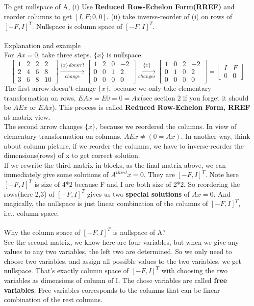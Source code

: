 \documentclass{article}
\begin{document}
\begin{spacing}{1.5}
\section{}
To get nullspace of A, (i) Use {\bfseries Reduced Row-Echelon Form(RREF)} and reorder columns to get $[I, F; 0, 0]$. (ii) take inverse-reorder of (i) on rows of $[-F, I]^T$. Nullspace is column space of  $[-F, I]^T$. \\
\\Explanation and example \\
For $Ax=0$, take three steps. $\{x\}$ is nullspace.
$$
\begin{bmatrix}
1 & 2 & 2 & 2 \\
2 & 4 & 6 & 8 \\ 
3 & 6 & 8 & 10 
\end{bmatrix}
\xrightarrow[change]{\{x\}\, doesn't}
\begin{bmatrix}
1 & 2 & 0 & -2 \\
0 & 0 & 1 & 2 \\ 
0 & 0 & 0 & 0
\end{bmatrix}
\xrightarrow[changes]{\{x\}}
\begin{bmatrix}
1 & 0 & 2 & -2 \\
0 & 1 & 0 & 2 \\ 
0 & 0 & 0 & 0
\end{bmatrix}
=
\begin{bmatrix}
	I & F \\
	0 & 0
\end{bmatrix}
$$
The first arrow doesn't change $\{x\}$, because we only take elementary transformation on rows, $EAx=E0=0=Ax$(see section 2 if you forget it should be $AEx$ or $EAx$). This process is called {\bfseries Reduced Row-Echelon Form, RREF} at matrix view. \\
The second arrow changes $\{x\}$, because we reordered the columns. In view of elementary transformation on columns, $AEx \neq (0=Ax)$. In another way, think about column picture, if we reorder the columns, we have to inverse-reorder the dimensions(rows) of x to get correct solution. \\
If we rewrite the third matrix in blocks, as the final matrix above, we can immediately give some solutions of $A^{third}x=0$. They are $[-F, I]^T$. Note here $[-F, I]^T$ is size of 4*2 because F and I are both size of 2*2. So reordering the rows(here 2,3) of $[-F, I]^T$ gives us two {\bfseries special solutions} of $Ax=0$. And magically, the nullspace is just linear combination of the columns of $[-F, I]^T$, i.e., column space. \\
\\Why the column space of $[-F, I]^T$ is nullspace of A? \\
See the second matrix, we know here are four variables, but when we give any values to any two variables, the left two are determined. So we only need to choose two variables, and assign all possible values to the two variables, we get nullspace. That's exactly column space of $[-F, I]^T$ with choosing the two variables as dimensions of column of I. The chose variables are called {\bfseries free variables}. Free variables corresponds to the columns that can be linear combination of the rest columns.



\end{spacing}
\end{document}
